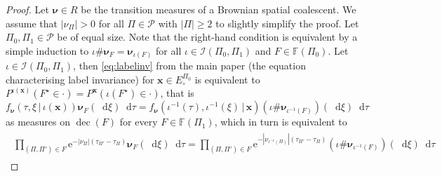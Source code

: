 \documentclass[reqno,draft]{amsart}
\numberwithin{equation}{section}
\theoremstyle{plain}
\newtheorem{lemma}[theorem]{Lemma}
\theoremstyle{remark}
\newcommand*\diff{\mathop{}\!\mathrm{d}}
\newcommand{\e}{\mathrm{e}}
\newcommand{\fpart}{\Pi} %
\newcommand{\rates}{R^\circ} %
\newcommand{\nurates}{R} %
\newcommand{\mergers}{M}
\DeclareMathOperator{\rt}{rt}
\DeclareMathOperator{\dcb}{dec}
\newcommand{\fnu}{f_{\boldsymbol \nu}}
\newcommand{\nut}[1]{|\nu_{#1}|}
\newcommand{\nkmap}{\kappa} %
\newcommand{\labelinv}{\mathcal{I}} %
\newcommand{\nunk}{\nu_{n,\smash{\vec{k}}}}
\begin{document}
\lemlabelinv*
\begin{proof}
    Let $\boldsymbol \nu \in \nurates$ be the transition measures of a Brownian spatial coalescent.
    We assume that $\nut{\fpart} > 0$ for all $\fpart \in \mathcal{P}$ with $|\fpart| \ge 2$ to slightly simplify the proof. Let $\fpart_0,\fpart_1 \in \mathcal{P}$ be of equal size.
    Note that the right-hand condition is equivalent by a simple induction to $\iota\# \boldsymbol \nu_F = \boldsymbol \nu_{\iota(F)}$ for all $\iota\in \labelinv(\fpart_0,\fpart_1)$ and $F\in \mathbb{F}(\fpart_0)$. Let $\iota\in \labelinv(\fpart_0,\fpart_1)$, then \eqref{eq:labelinv} from the main paper (the equation characterising label invariance) %
    for $\boldsymbol x\in E^{\fpart_0}_\circ $ is equivalent to $P^{\iota(\boldsymbol x)}(F^\star \in \cdot ) = P^{\boldsymbol x}(\iota(F^\star) \in \cdot )$, that is \[
        \fnu(\tau,\xi \,\vert\,\iota(\boldsymbol x)) \boldsymbol \nu_{F}(\diff \xi) \diff \tau = \fnu(\iota^{-1}(\tau),\iota^{-1}(\xi) \,\vert\,\boldsymbol x) (\iota\#\boldsymbol \nu_{\iota^{-1}(F)})(\diff \xi) \diff \tau
    \] as measures on $\dcb(F)$ for every $F\in \mathbb{F}(\fpart_1)$, which in turn is equivalent to
    \begin{align}\begin{split}\label{eqprf:labelinv:1}
        \prod_{(\fpart,\fpart')\in F} \e^{-\nut{\fpart}(\tau_{\fpart'}-\tau_{\fpart})} \boldsymbol \nu_F(\diff \xi) \diff \tau = \prod_{(\fpart,\fpart') \in F} \e^{-\nut{\iota^{-1}(\fpart)}(\tau_{\fpart'}-\tau_{\fpart})} (\iota \# \boldsymbol \nu_{\iota^{-1}(F)})(\diff \xi) \diff \tau

\end{split}
\end{align}
\end{proof}
\end{document}
